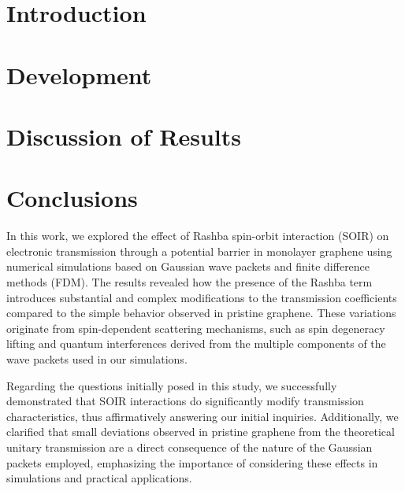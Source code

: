 \documentclass{../assets/templates/iopjournal}
\begin{document}



    \section{Introduction}\label{sec:introduction}
    


    \section{Development}\label{sec:development}
    


    \section{Discussion of Results}\label{sec:discussion-of-results}
    


    \section{Conclusions}\label{sec:conclusions}

    In this work, we explored the effect of Rashba spin-orbit interaction (SOIR) on electronic transmission through a potential barrier in monolayer graphene using numerical simulations based on Gaussian wave packets and finite difference methods (FDM). The results revealed how the presence of the Rashba term introduces substantial and complex modifications to the transmission coefficients compared to the simple behavior observed in pristine graphene.
    These variations originate from spin-dependent scattering mechanisms, such as spin degeneracy lifting and quantum interferences derived from the multiple components of the wave packets used in our simulations.

    Regarding the questions initially posed in this study, we successfully demonstrated that SOIR interactions do significantly modify transmission characteristics, thus affirmatively answering our initial inquiries.
    Additionally, we clarified that small deviations observed in pristine graphene from the theoretical unitary transmission are a direct consequence of the nature of the Gaussian packets employed, emphasizing the importance of considering these effects in simulations and practical applications.
\end{document}
